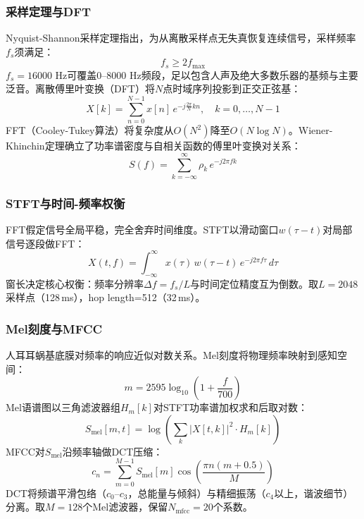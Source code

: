 \documentclass[12pt,a4paper]{article}
\begin{document}
\subsubsection{采样定理与DFT}

Nyquist-Shannon采样定理指出，为从离散采样点无失真恢复连续信号，采样频率$f_s$须满足：
\begin{equation}
    f_s \geq 2f_{\max}
    \label{eq:nyquist}
\end{equation}
$f_s=16000$ Hz可覆盖0--8000 Hz频段，足以包含人声及绝大多数乐器的基频与主要泛音。离散傅里叶变换（DFT）将$N$点时域序列投影到正交正弦基：
\begin{equation}
    X[k] = \sum_{n=0}^{N-1} x[n]\, e^{-j\frac{2\pi}{N}kn},\quad k=0,\ldots,N-1
    \label{eq:dft}
\end{equation}
FFT（Cooley-Tukey算法）将复杂度从$O(N^2)$降至$O(N\log N)$。Wiener-Khinchin定理确立了功率谱密度与自相关函数的傅里叶变换对关系：
\begin{equation}
    S(f) = \sum_{k=-\infty}^{\infty} \rho_k\, e^{-j2\pi fk}
    \label{eq:wiener}
\end{equation}

\subsubsection{STFT与时间-频率权衡}

FFT假定信号全局平稳，完全舍弃时间维度。STFT以滑动窗口$w(\tau-t)$对局部信号逐段做FFT：
\begin{equation}
    X(t,f) = \int_{-\infty}^{\infty} x(\tau)\,w(\tau-t)\,e^{-j2\pi f\tau}\,d\tau
    \label{eq:stft}
\end{equation}
窗长决定核心权衡：频率分辨率$\Delta f = f_s/L$与时间定位精度互为倒数。取$L=2048$采样点（128\,ms），hop length=512（32\,ms）。

\subsubsection{Mel刻度与MFCC}

人耳耳蜗基底膜对频率的响应近似对数关系。Mel刻度\cite{davis1980}将物理频率映射到感知空间：
\begin{equation}
    m = 2595\log_{10}\!\left(1+\frac{f}{700}\right)
    \label{eq:mel}
\end{equation}
Mel语谱图以三角滤波器组$H_m[k]$对STFT功率谱加权求和后取对数：
\begin{equation}
    S_{\text{mel}}[m,t] = \log\!\left(\sum_k |X[t,k]|^2\cdot H_m[k]\right)
    \label{eq:mel_spec}
\end{equation}
MFCC对$S_{\text{mel}}$沿频率轴做DCT压缩\cite{davis1980}：
\begin{equation}
    c_n = \sum_{m=0}^{M-1} S_{\text{mel}}[m]\cos\!\left(\frac{\pi n(m+0.5)}{M}\right)
    \label{eq:mfcc}
\end{equation}
DCT将频谱平滑包络（$c_0$--$c_3$，总能量与倾斜）与精细振荡（$c_4$以上，谐波细节）分离。取$M=128$个Mel滤波器，保留$N_{\text{mfcc}}=20$个系数。
\end{document}
